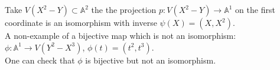\documentclass[../main.tex]{subfiles}
\begin{document}
\begin{exemple}
Take $V( X^{2}-Y) \subset \mathbb{A}^{2}$ the the projection $p: V( X^{2}-Y) \to \mathbb{A}^{1}$ on the first coordinate is an isomorphism with inverse $\psi( X) = ( X,X^{2}) $.\\
A non-example of a bijective map which is not an isomorphism:\\
$\phi: \mathbb{A}^{1}\to V( Y^{2}-X^{3}) $, $\phi( t ) = ( t^{2},t^{3}) $.\\
One can check that $\phi$ is bijective but not an isomorphism.
\end{exemple}


		
\end{document}

